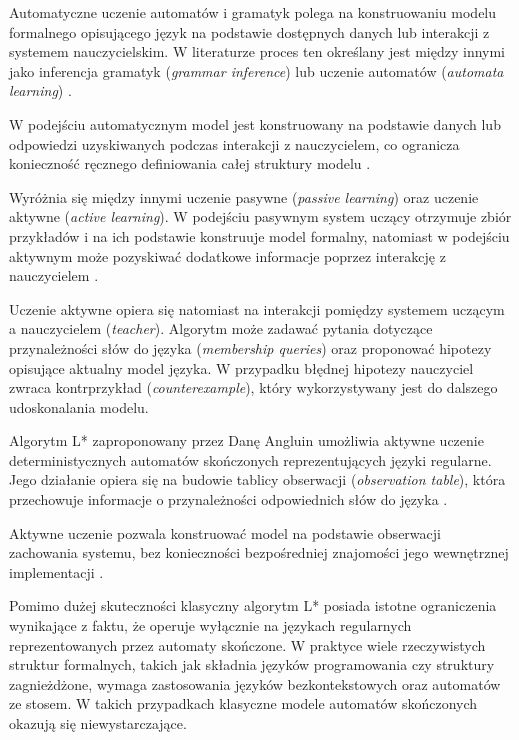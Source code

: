 \documentclass[12pt]{article}
\begin{document}
Automatyczne uczenie automatów i gramatyk polega na konstruowaniu modelu formalnego opisującego język na podstawie dostępnych danych lub interakcji z systemem nauczycielskim. W literaturze proces ten określany jest między innymi jako inferencja gramatyk (\textit{grammar inference}) lub uczenie automatów (\textit{automata learning}) \cite{angluin1987,zhao2023}.

W podejściu automatycznym model jest konstruowany na podstawie danych lub odpowiedzi uzyskiwanych podczas interakcji z nauczycielem, co ogranicza konieczność ręcznego definiowania całej struktury modelu \cite{angluin1987}.

Wyróżnia się między innymi uczenie pasywne (\textit{passive learning}) oraz uczenie aktywne (\textit{active learning}). W podejściu pasywnym system uczący otrzymuje zbiór przykładów i na ich podstawie konstruuje model formalny, natomiast w podejściu aktywnym może pozyskiwać dodatkowe informacje poprzez interakcję z nauczycielem \cite{angluin1987}.

Uczenie aktywne opiera się natomiast na interakcji pomiędzy systemem uczącym a nauczycielem (\textit{teacher}). Algorytm może zadawać pytania dotyczące przynależności słów do języka (\textit{membership queries}) oraz proponować hipotezy opisujące aktualny model języka. W przypadku błędnej hipotezy nauczyciel zwraca kontrprzykład (\textit{counterexample}), który wykorzystywany jest do dalszego udoskonalania modelu.

Algorytm L* zaproponowany przez Danę Angluin umożliwia aktywne uczenie deterministycznych automatów skończonych reprezentujących języki regularne. Jego działanie opiera się na budowie tablicy obserwacji (\textit{observation table}), która przechowuje informacje o przynależności odpowiednich słów do języka \cite{angluin1987}.

Aktywne uczenie pozwala konstruować model na podstawie obserwacji zachowania systemu, bez konieczności bezpośredniej znajomości jego wewnętrznej implementacji \cite{angluin1987}.

Pomimo dużej skuteczności klasyczny algorytm L* posiada istotne ograniczenia wynikające z faktu, że operuje wyłącznie na językach regularnych reprezentowanych przez automaty skończone. W praktyce wiele rzeczywistych struktur formalnych, takich jak składnia języków programowania czy struktury zagnieżdżone, wymaga zastosowania języków bezkontekstowych oraz automatów ze stosem. W takich przypadkach klasyczne modele automatów skończonych okazują się niewystarczające.
\end{document}
